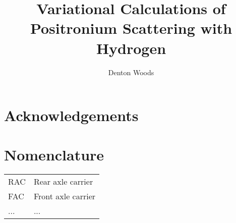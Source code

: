\title{Variational Calculations of Positronium Scattering with Hydrogen}
\author{Denton Woods}



\clearpage
{}
{} %
\maketitle
\newpage

\hypersetup{linktocpage}
\hypersetup{
    colorlinks,
    citecolor=black,
    filecolor=black,
    linkcolor=black,
    urlcolor=black
}

\tableofcontents
\newpage
\listoffigures
\listoftables
\newpage
{}


\clearpage
\chapter*{Acknowledgements}
\thispagestyle{plain}
\par\vspace*{.35\textheight}{\centering A lot of people helped me.\par}

\clearpage
\chapter*{Nomenclature}
\begin{longtable}[l]{p{20pt} p{100pt}}
RAC & Rear axle carrier  \\
FAC & Front axle carrier \\
... & ...                \\
\end{longtable}

